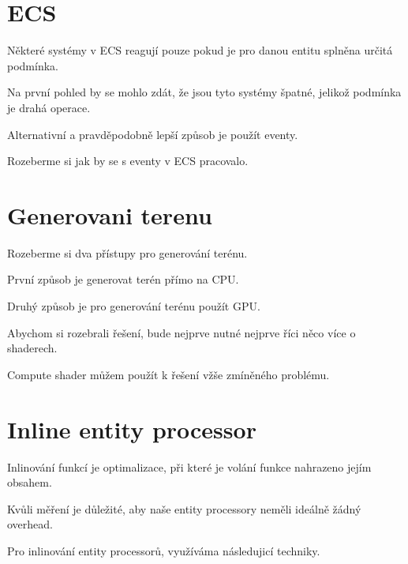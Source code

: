 \section{ECS}

Některé systémy v ECS reagují pouze pokud je pro danou entitu splněna určitá podmínka.

Na první pohled by se mohlo zdát, že jsou tyto systémy špatné, jelikož podmínka je drahá operace.

Alternativní a pravděpodobně lepší způsob je použít eventy.

Rozeberme si jak by se s eventy v ECS pracovalo.


\section{Generovani terenu}

Rozeberme si dva přístupy pro generování terénu.

První způsob je generovat terén přímo na CPU.

Druhý způsob je pro generování terénu použít GPU.


Abychom si rozebrali řešení, bude nejprve nutné nejprve říci něco více o shaderech.

Compute shader můžem použít k řešení vžše zmíněného problému.


\section{Inline entity processor}

Inlinování funkcí je optimalizace, při které je volání funkce nahrazeno jejím obsahem.


Kvůli měření je důležité, aby naše entity processory neměli ideálně žádný overhead.

Pro inlinování entity processorů, využíváma následujicí techniky.


